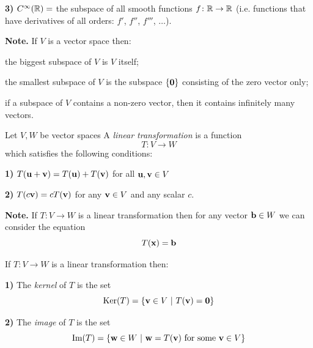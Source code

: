 {\vskip 7mm

{\bf 3)} $C^{\infty}({\mathbb R}) = $ the subspace of all  smooth functions $f\colon {\mathbb R}\to {\mathbb R}$ (i.e. functions that have derivatives 
of all orders: $f'$, $f''$, $f'''$, $\dots$).

\newpage

{\bf Note.} If $V$ is a vector space then:

\vskip 3mm

\benu
\item[\bf 1)] the biggest subspace of $V$ is $V$ itself; \\[-4mm]
\item[\bf 2)] the smallest subspace of $V$ is the subspace $\{{\bf 0}\}$ consisting of the zero vector only;\\[-4mm]
\item[\bf 3)] if a subspace of $V$ contains a non-zero vector, then it contains infinitely many vectors. 
\eenu






\begin{cbox}[Definition]
Let $V, W$ be vector spaces
A \emph{linear transformation} is  a function 
$$T\colon V \to W$$
which satisfies the following conditions:
\benu
\item[{\bf 1)}] $T({\bf u} + {\bf v}) = T({\bf u}) + T({\bf v})$ for all ${\bf u}, {\bf v} \in V$ \\[-4mm]
\item[{\bf 2)}] $T(c{\bf v}) = cT({\bf v})$ for any ${\bf v} \in V$ and any scalar $c$. 
\eenu
\end{cbox}


\vskip 90mm



\newpage

{\bf Note.} If  $T\colon V\to W$ is a linear transformation then for any vector ${\bf b}\in W$ we can consider the
equation
$$T({\bf x}) = {\bf b}$$


\newpage


\begin{cbox}[Definition]
If  $T\colon V \to W$ is a linear transformation then:

\benu
\item[{\bf 1)}] The \emph{kernel} of $T$ is the set 
$$\Ker(T) = \{\vv \in V \ | \ T(\vv) = \zzero\}$$
\item[{\bf 2)}] The \emph{image} of $T$ is the set 
$$\text{Im}(T) = \{{\bf w} \in W \ | \ {\bf w} =  T({\bf v}) \text{ for some } {\bf v}\in V\}$$
\eenu
\end{cbox}


}
